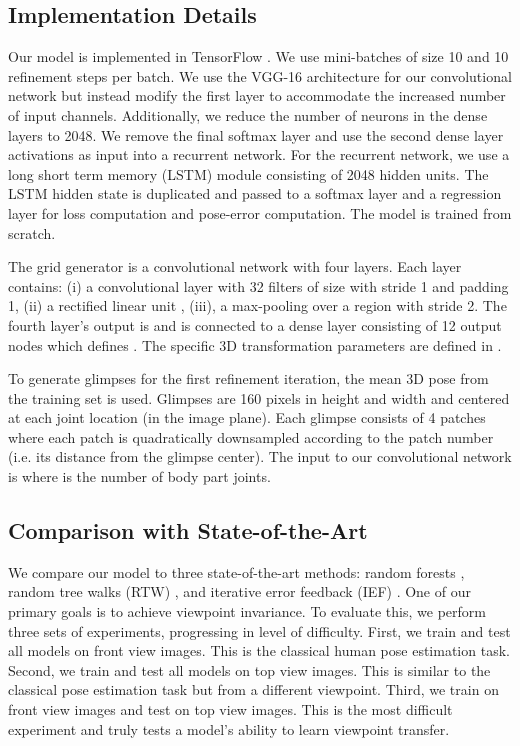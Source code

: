 \documentclass[runningheads]{llncs}
\begin{document}
	\subsection{Implementation Details}\label{sec:implementation_details}

	Our model is implemented in TensorFlow \cite{abaditensorflow}. We use mini-batches of size 10 and 10 refinement steps per batch. We use the VGG-16 \cite{simonyan2014very} architecture for our convolutional network but instead modify the first layer to accommodate the increased number of input channels.
	Additionally, we reduce the number of neurons in the dense layers to 2048. We remove the final softmax layer and use the second dense layer activations as input into a recurrent network. For the recurrent network, we use a long short term memory (LSTM) module \cite{hochreiter1997long} consisting of 2048 hidden units. The LSTM hidden state is duplicated and passed to a softmax layer and a regression layer for loss computation and pose-error computation. The model is trained from scratch.

	The grid generator is a convolutional network with four layers. Each layer contains: (i) a convolutional layer with 32 filters of size  with stride 1 and padding 1, (ii) a rectified linear unit \cite{nair2010rectified}, (iii), a max-pooling over a  region with stride 2. The fourth layer's output is  and is connected to a dense layer consisting of 12 output nodes which defines . The specific 3D transformation parameters are defined in \cite{jaderberg2015spatial}.

	To generate glimpses for the first refinement iteration, the mean 3D pose from the training set is used. Glimpses are 160 pixels in height and width and centered at each joint location (in the image plane). Each glimpse consists of 4 patches where each patch is quadratically downsampled according to the patch number (i.e. its distance from the glimpse center). The input to our convolutional network is  where  is the number of body part joints.

	\subsection{Comparison with State-of-the-Art}
	We compare our model to three state-of-the-art methods: random forests \cite{shotton2011real}, random tree walks (RTW) \cite{yub2015random}, and iterative error feedback (IEF) \cite{carreira2015human}. One of our primary goals is to achieve viewpoint invariance. To evaluate this, we perform three sets of experiments, progressing in level of difficulty. First, we train and test all models on front view images. This is the classical human pose estimation task. Second, we train and test all models on top view images. This is similar to the classical pose estimation task but from a different viewpoint. Third, we train on front view images and test on top view images. This is the most difficult experiment and truly tests a model's ability to learn viewpoint transfer.
\end{document}
